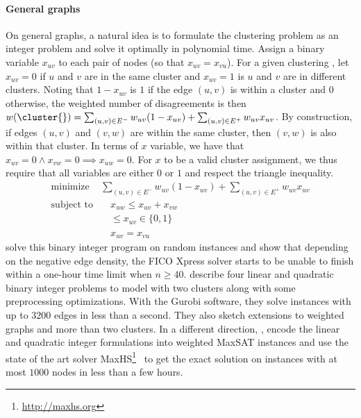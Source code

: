 

\paragraph{General graphs}

On general graphs, a natural idea is to formulate the clustering problem as an integer problem and
solve it optimally in polynomial time.
Assign a binary variable $x_{uv}$ to each pair
of nodes (so that $x_{uv}=x_{vu}$). For a given clustering \cluster{}, let $x_{uv} = 0$ if $u$ and
$v$ are in the same cluster and $x_{uv}=1$ is $u$ and $v$ are in different clusters. Noting that
$1-x_{uv}$ is $1$ if the edge $(u,v)$ is within a cluster and $0$ otherwise, the weighted
number of disagreements is then $w(\cluster{}) = \sum_{(u,v)\in E^-} w_{uv}(1-x_{uv}) +
\sum_{(u,v)\in E^+} w_{uv}x_{uv}$. By construction, if edges $(u,v)$ and $(v,w)$ are within the same
cluster, then $(v, w)$ is also within that cluster. In terms of $x$ variable, we have that $x_{uv}=0
\wedge x_{vw}=0 \implies x_{uw} = 0$. For $x$ to be a valid cluster assignment, we thus require that all
variables are either $0$ or $1$ and respect the triangle inequality.
\begin{align}
   \label{eq:mindIP}
   \text{minimize } & \sum_{(u,v)\in E^-} w_{uv}(1-x_{uv}) + \sum_{(u,v)\in E^+} w_{uv}x_{uv} \\
   \text{subject to}& \quad x_{uw} \leq x_{uv} + x_{vw} \nonumber\\
   \phantom{subject to}& \quad \leq x_{uv} \in \{0, 1\} \label{eq:mindInteger} \\
   \phantom{subject to}& \quad x_{uv} = x_{vu}  \nonumber
\end{align}
\Textcite{ExactMIP13} solve this binary integer program on random instances and show that
depending on the negative edge density, the FICO Xpress solver starts to be unable to finish within
a one-hour time limit when $n \geq 40$.
\Textcite{Aref2016} describe four linear and quadratic  binary integer problems
to model \pcc{} with two clusters along with some preprocessing optimizations. With the Gurobi
software, they solve instances with up to $3200$ edges in less than a second. They also sketch
extensions to weighted graphs and more than two clusters.
In a different direction, \textcite{Berg2015}, encode the linear and quadratic integer formulations
into weighted MaxSAT instances and use the state of the art solver
MaxHS\footnote{\href{http://www.maxhs.org/}{http://maxhs.org}}~\autocite{SATSolver13} to get the
exact solution on instances with at most $1000$ nodes in less than a few hours.


